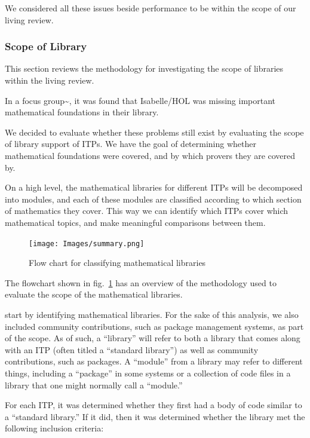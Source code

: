 \documentclass[
]{article}
\begin{document}
We considered all these issues beside performance to be within the scope
of our living review.

\hypertarget{scope-of-library}{%
\subsubsection{Scope of Library}\label{scope-of-library}}

This section reviews the methodology for investigating the scope of
libraries within the living review.

In a focus group\textasciitilde{}\cite{beckert_usability_2015}, it was
found that Isabelle/HOL was missing important mathematical foundations
in their library.

We decided to evaluate whether these problems still exist by evaluating
the scope of library support of ITPs. We have the goal of determining
whether mathematical foundations were covered, and by which provers they
are covered by.

On a high level, the mathematical libraries for different ITPs will be
decomposed into modules, and each of these modules are classified
according to which section of mathematics they cover. This way we can
identify which ITPs cover which mathematical topics, and make meaningful
comparisons between them.

\begin{figure}
\hypertarget{fig:classification_summary}{%
\centering
\texttt{[image: Images/summary.png]}
\caption{Flow chart for classifying mathematical
libraries}\label{fig:classification_summary}
}
\end{figure}

The flowchart shown in fig.~\ref{fig:classification_summary} has an
overview of the methodology used to evaluate the scope of the
mathematical libraries.

start by identifying mathematical libraries. For the sake of this
analysis, we also included community contributions, such as package
management systems, as part of the scope. As of such, a ``library'' will
refer to both a library that comes along with an ITP (often titled a
``standard library'') as well as community contributions, such as
packages. A ``module'' from a library may refer to different things,
including a ``package'' in some systems or a collection of code files in
a library that one might normally call a ``module.''

For each ITP, it was determined whether they first had a body of code
similar to a ``standard library.'' If it did, then it was determined
whether the library met the following inclusion criteria:
\end{document}
